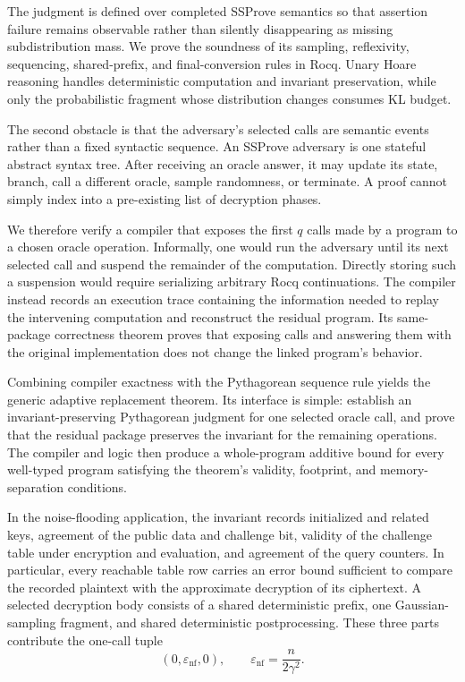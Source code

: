 The judgment is defined over completed SSProve semantics so that assertion failure remains observable rather than silently disappearing as missing subdistribution mass. We prove the soundness of its sampling, reflexivity, sequencing, shared-prefix, and final-conversion rules in Rocq. Unary Hoare reasoning handles deterministic computation and invariant preservation, while only the probabilistic fragment whose distribution changes consumes KL budget.

The second obstacle is that the adversary's selected calls are semantic events rather than a fixed syntactic sequence. An SSProve adversary is one stateful abstract syntax tree. After receiving an oracle answer, it may update its state, branch, call a different oracle, sample randomness, or terminate. A proof cannot simply index into a pre-existing list of decryption phases.

We therefore verify a compiler that exposes the first $q$ calls made by a program to a chosen oracle operation. Informally, one would run the adversary until its next selected call and suspend the remainder of the computation. Directly storing such a suspension would require serializing arbitrary Rocq continuations. The compiler instead records an execution trace containing the information needed to replay the intervening computation and reconstruct the residual program. Its same-package correctness theorem proves that exposing calls and answering them with the original implementation does not change the linked program's behavior.

Combining compiler exactness with the Pythagorean sequence rule yields the generic adaptive replacement theorem. Its interface is simple: establish an invariant-preserving Pythagorean judgment for one selected oracle call, and prove that the residual package preserves the invariant for the remaining operations. The compiler and logic then produce a whole-program additive bound for every well-typed program satisfying the theorem's validity, footprint, and memory-separation conditions.

In the noise-flooding application, the invariant records initialized and related keys, agreement of the public data and challenge bit, validity of the challenge table under encryption and evaluation, and agreement of the query counters. In particular, every reachable table row carries an error bound sufficient to compare the recorded plaintext with the approximate decryption of its ciphertext. A selected decryption body consists of a shared deterministic prefix, one Gaussian-sampling fragment, and shared deterministic postprocessing. These three parts contribute the one-call tuple
\[
\left(0,\varepsilon_{\mathrm{nf}},0\right),
\qquad
\varepsilon_{\mathrm{nf}}
=
\frac{n}{2\gamma^{2}}.
\]

